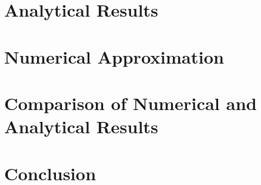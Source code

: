 \section{Analytical Results}


\section{Numerical Approximation}



\section{Comparison of Numerical and Analytical Results}


\section{Conclusion}
